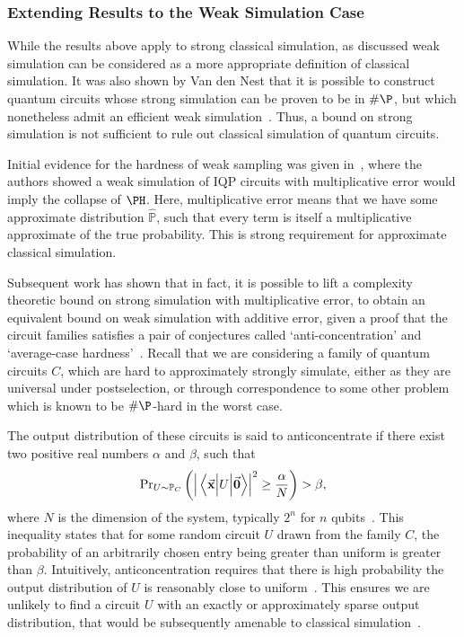 \subsubsection{Extending Results to the Weak Simulation Case}
While the results above apply to strong classical simulation, as discussed weak simulation can be considered as a more appropriate definition of classical simulation. It was also shown by Van den Nest that it is possible to construct quantum circuits whose strong simulation can be proven to be in $\#\P$, but which nonetheless admit an efficient weak simulation~\cite{VandenNest2008}. Thus, a bound on strong simulation is not sufficient to rule out classical simulation of quantum circuits.\par
Initial evidence for the hardness of weak sampling was given in~\cite{Bremner2011}, where the authors showed a weak simulation of IQP circuits with multiplicative error would imply the collapse of $\PH$. Here, multiplicative error means that we have some approximate distribution $\hat{\mathbb{P}}$, such that every term is itself a multiplicative approximate of the true probability. This is strong requirement for approximate classical simulation.\par
Subsequent work has shown that in fact, it is possible to lift a complexity theoretic bound on strong simulation with multiplicative error, to obtain an equivalent bound on weak simulation with additive error, given a proof that the circuit families satisfies a pair of conjectures called `anti-concentration' and `average-case hardness'~\cite{Hangleiter2017}. Recall that we are considering a family of quantum circuits $C$, which are hard to approximately strongly simulate, either as they are universal under postselection, or through correspondence to some other problem which is known to be $\#\P$-hard in the worst case.\par
The output distribution of these circuits is said to anticoncentrate if there exist two positive real numbers $\alpha$ and $\beta$, such that
\begin{equation}
\text{Pr}_{U\sim \mathbb{P}_{C}}\left(\left|\matrixel{\va{x}}{U}{\va{0}}\right|^{2}\geq \frac{\alpha}{N}\right) > \beta,
\label{eq:anticoncentration}
\end{equation}
where $N$ is the dimension of the system, typically $2^{n}$ for $n$ qubits~\cite{Hangleiter2017}. This inequality states that for some random circuit $U$ drawn from the family $C$, the probability of an arbitrarily chosen entry being greater than uniform is greater than $\beta$. Intuitively, anticoncentration requires that there is high probability the output distribution of $U$ is reasonably close to uniform~\cite{Harrow2017}. This ensures we are unlikely to find a circuit $U$ with an exactly or approximately sparse output distribution, that would be subsequently amenable to classical simulation~\cite{VandenNest2008,Schwarz2013}.\par
